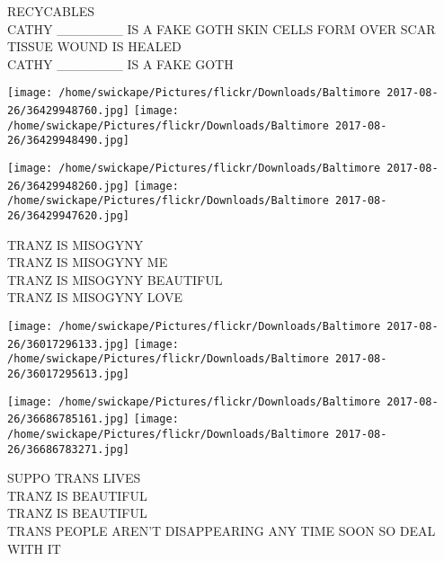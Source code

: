 \documentclass[10pt,letterpaper]{article}
\begin{document}
RECYCABLES\\
CATHY \_\_\_\_\_\_\_ IS A FAKE GOTH SKIN CELLS FORM OVER SCAR TISSUE WOUND IS HEALED\\
CATHY \_\_\_\_\_\_\_ IS A FAKE GOTH\\
\pagebreak

\texttt{[image: /home/swickape/Pictures/flickr/Downloads/Baltimore 2017-08-26/36429948760.jpg]}
\texttt{[image: /home/swickape/Pictures/flickr/Downloads/Baltimore 2017-08-26/36429948490.jpg]}

\texttt{[image: /home/swickape/Pictures/flickr/Downloads/Baltimore 2017-08-26/36429948260.jpg]}
\texttt{[image: /home/swickape/Pictures/flickr/Downloads/Baltimore 2017-08-26/36429947620.jpg]}

TRANZ IS MISOGYNY\\
TRANZ IS MISOGYNY ME\\
TRANZ IS MISOGYNY BEAUTIFUL\\
TRANZ IS MISOGYNY LOVE\\
\pagebreak

\texttt{[image: /home/swickape/Pictures/flickr/Downloads/Baltimore 2017-08-26/36017296133.jpg]}
\texttt{[image: /home/swickape/Pictures/flickr/Downloads/Baltimore 2017-08-26/36017295613.jpg]}

\texttt{[image: /home/swickape/Pictures/flickr/Downloads/Baltimore 2017-08-26/36686785161.jpg]}
\texttt{[image: /home/swickape/Pictures/flickr/Downloads/Baltimore 2017-08-26/36686783271.jpg]}

SUPPO TRANS LIVES\\
TRANZ IS BEAUTIFUL\\
TRANZ IS BEAUTIFUL\\
TRANS PEOPLE AREN'T DISAPPEARING ANY TIME SOON SO DEAL WITH IT\\
\pagebreak
\end{document}
